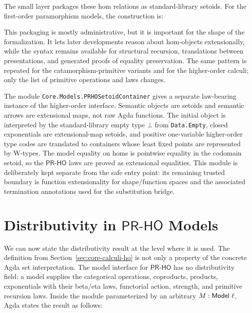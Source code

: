 \documentclass[sigplan,10pt,anonymous,review,screen]{acmart}
\newcommand{\PRHO}{\ensuremath{\mathsf{PR\mbox{-}HO}}}
\newcommand{\AgdaFile}[1]{\texttt{#1}}
\begin{document}
The small  layer packages these hom
relations as standard-library setoids.  For the first-order
paramorphism models, the construction is:

{\small
\CorePRFOHomSetoid*
}

This packaging is mostly administrative, but it is important for the
shape of the formalization.  It lets later developments reason about
hom-objects extensionally, while the syntax remains available for
structural recursion, translations between presentations, and generated
proofs of equality preservation.  The same pattern is repeated for the
catamorphism-primitive variants and for the higher-order calculi; only the list
of primitive operations and laws changes.

The module \AgdaFile{Core.Models.PRHOSetoidContainer} gives a separate
law-bearing instance of the higher-order interface.  Semantic objects are
setoids and semantic arrows are extensional maps, not raw Agda
functions.  The initial object is interpreted by the standard-library
empty type \(\bot\) from \AgdaFile{Data.Empty},
closed exponentials are extensional-map setoids, and positive
one-variable higher-order type codes are translated to containers whose
least fixed points are represented by W-types.  The model equality on
homs is pointwise equality in the codomain setoid, so the \PRHO{} laws
are proved as extensional equalities.  This module is deliberately kept
separate from the safe entry point: its remaining trusted boundary is
function extensionality for shape/function spaces and the associated
termination annotations used for the substitution bridge.

\section{Distributivity in \PRHO{} Models}
\label{sec:prho-model-distributivity}

We can now state the distributivity result at the level where it is
used.  The definition from Section~\ref{sec:core-calculi-ho} is not only
a property of the concrete Agda set interpretation.  The model interface
for \PRHO{} has no distributivity field: a model supplies the
categorical operations, coproducts, products, exponentials with their
beta/eta laws, functorial action, strength, and primitive recursion laws.
Inside the module parameterized by an arbitrary \(M :
\AgdaRecord{Model}\ \ell\), Agda states the result as follows:

{\small
\CorePRHOModelDistributivity*
}
\end{document}
